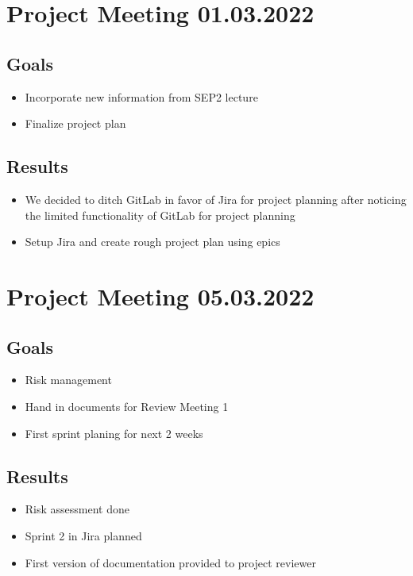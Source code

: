 \section{Project Meeting 01.03.2022}

\subsection{Goals}
\begin{itemize}
    \item Incorporate new information from SEP2 lecture
    \item Finalize project plan
\end{itemize}

\subsection{Results}
\begin{itemize}
    \item We decided to ditch GitLab in favor of Jira for project planning after noticing the limited functionality of GitLab for project planning
    \item Setup Jira and create rough project plan using epics
\end{itemize}


\section{Project Meeting 05.03.2022}

\subsection{Goals}
\begin{itemize}
    \item Risk management
    \item Hand in documents for Review Meeting 1
    \item First sprint planing for next 2 weeks
\end{itemize}

\subsection{Results}
\begin{itemize}
    \item Risk assessment done
    \item Sprint 2 in Jira planned
    \item First version of documentation provided to project reviewer
\end{itemize}


